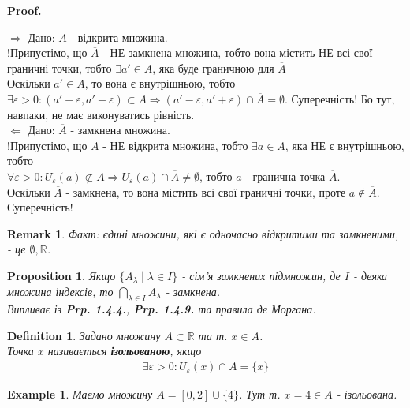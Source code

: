 \documentclass[a4paper, 14pt]{article}
\makeatletter
\def\qed{$\blacksquare$}
\def\rightproof{$\boxed{\Rightarrow}$ }
\def\leftproof{$\boxed{\Leftarrow}$ }
\theoremstyle{theoremdd}
\theoremstyle{theoremdd}
\newtheorem{definition}[theorem]{Definition}
\theoremstyle{theoremdd}
\theoremstyle{theoremdd}
\newtheorem{example}[theorem]{Example}
\theoremstyle{theoremdd}
\newtheorem{proposition}[theorem]{Proposition}
\theoremstyle{theoremdd}
\newtheorem{remark}[theorem]{Remark}
\theoremstyle{theoremdd}
\theoremstyle{theoremdd}
\renewenvironment{proof}[1][Proof.\\]{\par
\pushQED{\hfill \qed}%
\normalfont \topsep6\p@\@plus6\p@\relax
\trivlist
\item\relax
{\bfseries
#1\@addpunct{.}}\hspace\labelsep\ignorespaces
}{%
\popQED\endtrivlist\@endpefalse
}
\makeatother
\begin{document}
\begin{proof}
\rightproof Дано: $A$ - відкрита множина.\\
!Припустімо, що $\overline{A}$ - НЕ замкнена множина, тобто вона містить НЕ всі свої граничні точки, тобто $\exists a' \in A$, яка буде граничною для $\overline{A}$\\
Оскільки $a' \in A$, то вона є внутрішньою, тобто $\exists \varepsilon > 0: (a'-\varepsilon,a'+\varepsilon) \subset A \Rightarrow (a'-\varepsilon,a'+\varepsilon) \cap \overline{A} = \emptyset$. Суперечність! Бо тут, навпаки, не має виконуватись рівність.
\bigskip \\
\leftproof Дано: $\overline{A}$ - замкнена множина.\\
!Припустімо, що $A$ - НЕ відкрита множина, тобто $\exists a \in A$, яка НЕ є внутрішньою, тобто\\
$\forall \varepsilon > 0: U_{\varepsilon}(a) \not\subset A \Rightarrow U_{\varepsilon}(a) \cap \overline{A} \neq \emptyset$, тобто $a$ - гранична точка $\overline{A}$.\\
Оскільки $\overline{A}$ - замкнена, то вона містить всі свої граничні точки, проте $a \not\in \overline{A}$. Суперечність!
\end{proof}

\begin{remark}
Факт: єдині множини, які є одночасно відкритими та замкненими, - це $\emptyset, \mathbb{R}$.
\end{remark}

\begin{proposition}
Якщо $\{A_{\lambda} \mid \lambda \in I\}$ - сім'я замкнених підмножин, де $I$ - деяка множина індексів, то $\displaystyle \bigcap_{\lambda \in I} A_{\lambda}$ - замкнена.\\
\textit{Випливає із} \textbf{Prp. 1.4.4.}, \textbf{Prp. 1.4.9.} \textit{та правила де Моргана.}
\end{proposition}

\begin{definition}
Задано множину $A \subset \mathbb{R}$ та т. $x \in A$.\\
Точка $x$ називається \textbf{ізольованою}, якщо
\begin{align*}
\exists \varepsilon > 0: U_{\varepsilon}(x) \cap A = \{x\}
\end{align*}
\end{definition}

\begin{example}
Маємо множину $A = [0,2] \cup \{4\}$. Тут т. $x = 4 \in A$ - ізольована.
\begin{figure}[H]
\centering
{}

\end{figure}
\end{example}
\end{document}
